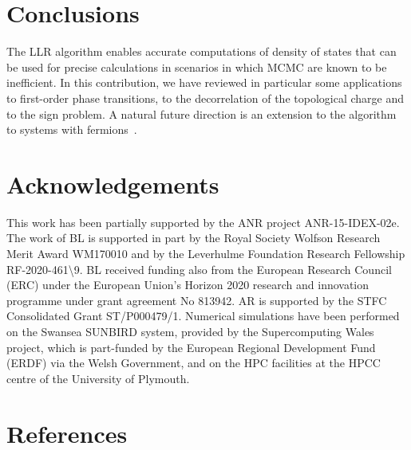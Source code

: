 \documentclass[a4paper]{jpconf}
\begin{document}
\section{Conclusions}
\label{sect:conclusions}
The LLR algorithm enables accurate computations of density of states
that can be used for precise calculations in scenarios in which MCMC
are known to be inefficient. In this contribution, we have reviewed
in particular some applications to first-order phase transitions, to
the decorrelation of the topological charge and to the sign
problem. A natural future direction is an extension to the algorithm
to systems with fermions~\cite{Francesconi:2019aet}. 

\section*{Acknowledgements}
 This work has been partially supported by the ANR project
 ANR-15-IDEX-02e. The work of BL is supported in
part by the Royal Society Wolfson Research Merit Award
WM170010 and by the Leverhulme Foundation Research
Fellowship RF-2020-461\textbackslash 9. BL received funding also from the
European Research Council (ERC) under the European Union’s Horizon
2020 research and innovation programme under grant agreement No 813942.
AR is supported by the STFC
Consolidated Grant ST/P000479/1. Numerical simulations have been
performed on the Swansea SUNBIRD system, provided by the
Supercomputing Wales project, which is part-funded by the European
Regional Development Fund (ERDF) via the Welsh Government, and on the
HPC facilities at the HPCC centre of the University of Plymouth.

\section*{References}


\end{document}
